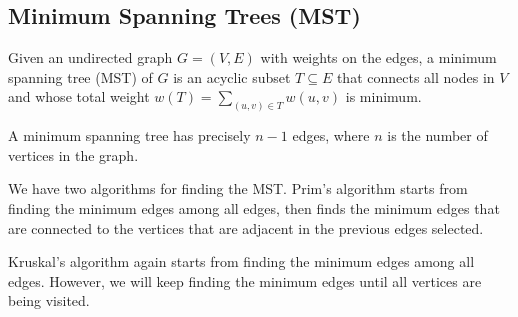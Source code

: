 \subsection{Minimum Spanning Trees (MST)}
Given an undirected graph \(G = (V, E)\) with weights on the edges, a minimum spanning tree (MST) of \(G\) is an acyclic subset \(T \subseteq E\) that connects all nodes in \(V\) and whose total weight \(w(T) = \sum_{(u, v) \in T} w(u, v)\) is minimum. 

A minimum spanning tree has precisely \(n-1\) edges, where \(n\) is the number of vertices in the graph.

We have two algorithms for finding the MST. Prim's algorithm starts from finding the minimum edges among all edges, then finds the minimum edges that are connected to the vertices that are adjacent in the previous edges selected.

Kruskal's algorithm again starts from finding the minimum edges among all edges. However, we will keep finding the minimum edges until all vertices are being visited. 


